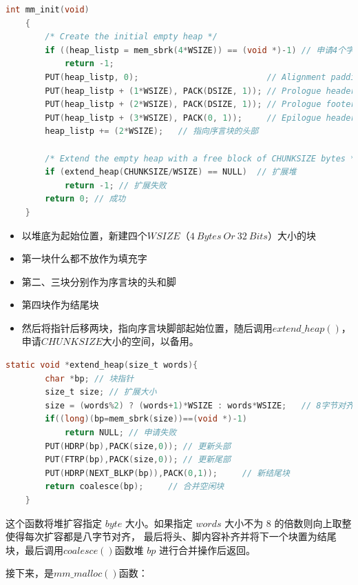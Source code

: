 \begin{lstlisting}[language = C , title = { mm\_init.c } ]
    int mm_init(void) 
    {
        /* Create the initial empty heap */
        if ((heap_listp = mem_sbrk(4*WSIZE)) == (void *)-1) // 申请4个字节
            return -1;
        PUT(heap_listp, 0);                          // Alignment padding
        PUT(heap_listp + (1*WSIZE), PACK(DSIZE, 1)); // Prologue header
        PUT(heap_listp + (2*WSIZE), PACK(DSIZE, 1)); // Prologue footer 
        PUT(heap_listp + (3*WSIZE), PACK(0, 1));     // Epilogue header
        heap_listp += (2*WSIZE);   // 指向序言块的头部                   
    
        /* Extend the empty heap with a free block of CHUNKSIZE bytes */
        if (extend_heap(CHUNKSIZE/WSIZE) == NULL)  // 扩展堆
            return -1; // 扩展失败
        return 0; // 成功
    }
\end{lstlisting}

\begin{itemize}
    \item 以堆底为起始位置，新建四个$WSIZE（4\ Bytes\ Or \ 32\ Bits）$大小的块
    \item 第一块什么都不放作为填充字
    \item 第二、三块分别作为序言块的头和脚
    \item 第四块作为结尾块
    \item 然后将指针后移两块，指向序言块脚部起始位置，随后调用$extend\_heap()$，申请$CHUNKSIZE$大小的空间，以备用。
\end{itemize}

\begin{lstlisting}[language = C , title = { Extend\_heap.c } ]
    static void *extend_heap(size_t words){
        char *bp; // 块指针
        size_t size; // 扩展大小
        size = (words%2) ? (words+1)*WSIZE : words*WSIZE;   // 8字节对齐
        if((long)(bp=mem_sbrk(size))==(void *)-1) 
            return NULL; // 申请失败
        PUT(HDRP(bp),PACK(size,0)); // 更新头部
        PUT(FTRP(bp),PACK(size,0)); // 更新尾部
        PUT(HDRP(NEXT_BLKP(bp)),PACK(0,1));     // 新结尾块 
        return coalesce(bp);     // 合并空闲块
    }
\end{lstlisting}

这个函数将堆扩容指定 $byte$ 大小。如果指定 $words$ 大小不为 $8$ 的倍数则向上取整使得每次扩容都是八字节对齐，
最后将头、脚内容补齐并将下一个块置为结尾块，最后调用$coalesce()$函数堆 $bp$ 进行合并操作后返回。

接下来，是$mm\_malloc()$函数：

